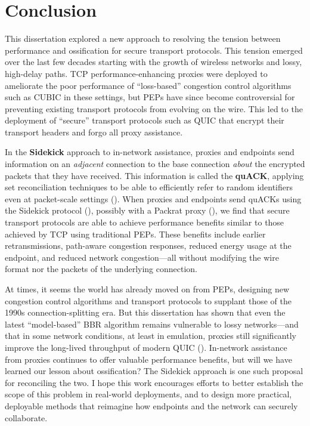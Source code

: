 \chapter{Conclusion}
\label{sec:conclusion}

This dissertation explored a new approach to resolving the tension between
performance and ossification for secure transport protocols. This tension
emerged over the last few decades starting with the growth of wireless networks
and lossy, high-delay paths. TCP performance-enhancing proxies were deployed to
ameliorate the poor performance of ``loss-based'' congestion control algorithms
such as CUBIC in these settings, but PEPs have since become controversial for
preventing existing transport protocols from evolving on the wire. This led to
the deployment of ``secure'' transport protocols such as QUIC that encrypt
their transport headers and forgo all proxy assistance.

In the \textbf{Sidekick} approach to in-network assistance, proxies and
endpoints send information on an \textit{adjacent} connection to the base
connection \textit{about} the encrypted packets that they have received. This
information is called the \textbf{quACK}, applying set reconciliation
techniques to be able to efficiently refer to random identifiers even at
packet-scale settings (). When proxies and endpoints send
quACKs using the Sidekick protocol (), possibly with a
Packrat proxy
(), we find that secure transport protocols are able to
achieve performance benefits similar to those achieved by TCP using traditional
PEPs. These benefits include earlier retransmissions, path-aware congestion
responses, reduced energy usage at the endpoint, and reduced network
congestion---all without modifying the wire format nor the packets of the
underlying connection.

At times, it seems the world has already moved on from PEPs, designing new
congestion control algorithms and transport protocols to supplant those of the
1990s connection-splitting era. But this dissertation has shown that even the
latest ``model-based'' BBR algorithm remains vulnerable to lossy networks---and
that in some network conditions, at least in emulation, proxies still
significantly improve the long-lived throughput of modern QUIC
(). In-network assistance from proxies continues to offer
valuable performance benefits, but will we have learned our lesson about
ossification? The Sidekick approach is one such proposal for reconciling the
two. I hope this work encourages efforts to better establish the scope of this
problem in real-world deployments, and to design more practical, deployable
methods that reimagine how endpoints and the network can securely collaborate.

